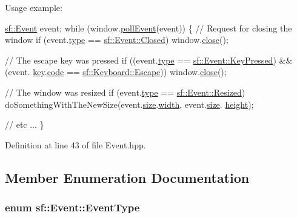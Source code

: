 Usage example\-: 
\begin{DoxyCode}
\hyperlink{classsf_1_1_event}{sf::Event} event;
\textcolor{keywordflow}{while} (window.\hyperlink{classsf_1_1_window_a338e996585faf82e93069858e3b531b7}{pollEvent}(event))
\{
    \textcolor{comment}{// Request for closing the window}
    \textcolor{keywordflow}{if} (event.\hyperlink{classsf_1_1_event_adf2f8044f713fd9d6019077b0d1ffe0a}{type} == \hyperlink{classsf_1_1_event_af41fa9ed45c02449030699f671331d4aa316e4212e083f1dce79efd8d9e9c0a95}{sf::Event::Closed})
        window.\hyperlink{classsf_1_1_window_a99d1e030387b0c26f5995670504fe7b5}{close}();

    \textcolor{comment}{// The escape key was pressed}
    \textcolor{keywordflow}{if} ((event.\hyperlink{classsf_1_1_event_adf2f8044f713fd9d6019077b0d1ffe0a}{type} == \hyperlink{classsf_1_1_event_af41fa9ed45c02449030699f671331d4aac3c7abfaa98c73bfe6be0b57df09c71b}{sf::Event::KeyPressed}) && (event.
      \hyperlink{classsf_1_1_event_a45b92fc6757ca7c193f06b302e424ab0}{key}.\hyperlink{structsf_1_1_event_1_1_key_event_a2879fdab8a68cb1c6ecc45730a2d0e61}{code} == \hyperlink{classsf_1_1_keyboard_acb4cacd7cc5802dec45724cf3314a142a64b7ecb543c5d03bec8383dde123c95d}{sf::Keyboard::Escape}))
        window.\hyperlink{classsf_1_1_window_a99d1e030387b0c26f5995670504fe7b5}{close}();

    \textcolor{comment}{// The window was resized}
    \textcolor{keywordflow}{if} (event.\hyperlink{classsf_1_1_event_adf2f8044f713fd9d6019077b0d1ffe0a}{type} == \hyperlink{classsf_1_1_event_af41fa9ed45c02449030699f671331d4aa67fd26d7e520bc6722db3ff47ef24941}{sf::Event::Resized})
        doSomethingWithTheNewSize(event.\hyperlink{classsf_1_1_event_a85dae56a377eeffd39183c3f6fc96cb9}{size}.\hyperlink{structsf_1_1_event_1_1_size_event_a20ea1b78c9bb1604432f8f0067bbfd94}{width}, event.\hyperlink{classsf_1_1_event_a85dae56a377eeffd39183c3f6fc96cb9}{size}.
      \hyperlink{structsf_1_1_event_1_1_size_event_af0f76a599d5f48189cb8d78d4e5facdb}{height});

    \textcolor{comment}{// etc ...}
\}
\end{DoxyCode}
 

Definition at line 43 of file Event.\-hpp.



\subsection{Member Enumeration Documentation}
\hypertarget{classsf_1_1_event_af41fa9ed45c02449030699f671331d4a}{
\subsubsection[{Event\-Type}]{\setlength{\rightskip}{0pt plus 5cm}enum {\bf sf\-::\-Event\-::\-Event\-Type}}}\label{classsf_1_1_event_af41fa9ed45c02449030699f671331d4a}


